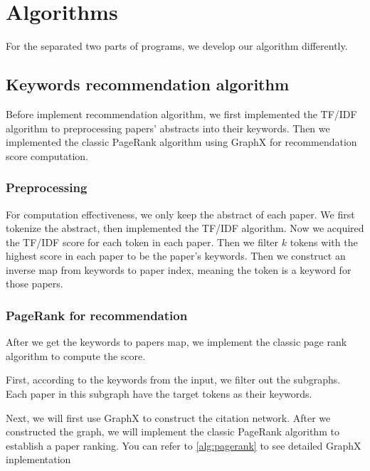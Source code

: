 \section{Algorithms}

For the separated two parts of programs, we develop our algorithm differently. 

\subsection{Keywords recommendation algorithm}

Before implement recommendation algorithm, we first implemented the TF/IDF algorithm to preprocessing papers' abstracts into their keywords. Then we implemented the classic PageRank algorithm using GraphX for recommendation score computation.

\subsubsection{Preprocessing}

For computation effectiveness, we only keep the abstract of each paper. We first tokenize the abstract, then implemented the TF/IDF algorithm. Now we acquired the TF/IDF score for each token in each paper. Then we filter $k$ tokens with the highest score in each paper to be the paper's keywords. Then we construct an inverse map from keywords to paper index, meaning the token is a keyword for those papers. 

\subsubsection{PageRank for recommendation}

After we get the keywords to papers map, we implement the classic page rank algorithm to compute the score. 

First, according to the keywords from the input, we filter out the subgraphs. Each paper in this subgraph have the target tokens as their keywords. 

Next, we will first use GraphX to construct the citation network.  After we constructed the graph, we will implement the classic PageRank algorithm to establish a paper ranking. You can refer to \ref{alg:pagerank} to see detailed GraphX inplementation

